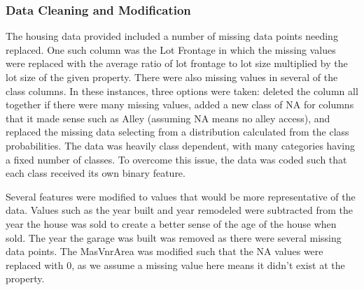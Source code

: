 \documentclass[fleqn,10pt]{SelfArx} %
\begin{document}

\subsubsection{Data Cleaning and Modification}


The housing data provided included a number of missing data points needing replaced. One such column was the Lot Frontage in which the missing values were replaced with the average
ratio of lot frontage to lot size multiplied by the lot size of the given property. There were also missing values in several of the class columns. In these instances, three options
were taken: deleted the column all together if there were many missing values, added a new class of NA for columns that it made sense such as Alley (assuming NA means no alley access), and replaced the missing data selecting from a distribution calculated from the class probabilities. The data was heavily class dependent, with many categories having a fixed number 
of classes. To overcome this issue, the data was coded such that each class received its own binary feature.

Several features were modified to values that would be more representative of the data. Values such as the year built and year remodeled were subtracted from the year the house was sold to create a better sense of the age of the house when sold. The year the garage was built was removed as there were several missing data points. The MasVnrArea was modified such that the NA values were replaced with 0, as we assume a missing value here means it didn't exist at the property.


\end{document}
